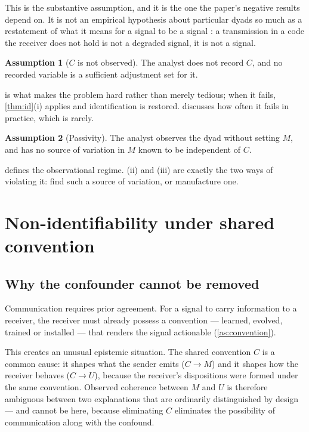 \documentclass[11pt,a4paper]{article}
\theoremstyle{plain}
\theoremstyle{definition}
\newtheorem{assumption}{Assumption}
\theoremstyle{remark}
\begin{document}
This is the substantive assumption, and it is the one the paper's negative results depend
on. It is not an empirical hypothesis about particular dyads so much as a restatement of
what it means for a signal to be a signal \citep{lewis1969convention, skyrms2010signals}: a
transmission in a code the receiver does not hold is not a degraded signal, it is not a
signal.

\begin{assumption}[$C$ is not observed]\label{as:unobserved}
The analyst does not record $C$, and no recorded variable is a sufficient adjustment set for
it.
\end{assumption}

 is what makes the problem hard rather than merely tedious; when it
fails, \cref{thm:id}(i) applies and identification is restored. 
discusses how often it fails in practice, which is rarely.

\begin{assumption}[Passivity]\label{as:passive}
The analyst observes the dyad without setting $M$, and has no source of variation in $M$
known to be independent of $C$.
\end{assumption}

 defines the observational regime. (ii) and (iii) are exactly
the two ways of violating it: find such a source of variation, or manufacture one.

\section{Non-identifiability under shared convention}\label{sec:nonid}

\subsection{Why the confounder cannot be removed}

Communication requires prior agreement. For a signal to carry information to a receiver, the
receiver must already possess a convention --- learned, evolved, trained or installed ---
that renders the signal actionable (\cref{as:convention}).

This creates an unusual epistemic situation. The shared convention $C$ is a common cause: it
shapes what the sender emits ($C \to M$) and it shapes how the receiver behaves ($C \to U$),
because the receiver's dispositions were formed under the same convention. Observed coherence
between $M$ and $U$ is therefore ambiguous between two explanations that are ordinarily
distinguished by design --- and cannot be here, because eliminating $C$ eliminates the
possibility of communication along with the confound.
\end{document}
